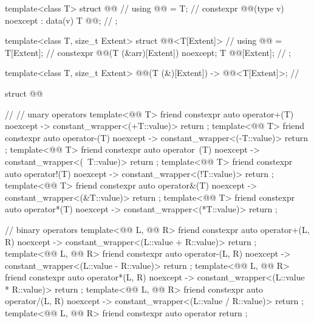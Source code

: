 \begin{codeblock}
template<class T>
struct @@ {                                                         // \expos
  using @@ = T;                                                               // \expos
  constexpr @@(type v) noexcept : data(v) {}
  T @@;                                                                       // \expos
};

template<class T, size_t Extent>
struct @@<T[Extent]> {                                              // \expos
  using @@ = T[Extent];                                                       // \expos
  constexpr @@(T (&arr)[Extent]) noexcept;
  T @@[Extent];                                                               // \expos
};

template<class T, size_t Extent>
  @@(T (&)[Extent]) -> @@<T[Extent]>;                   // \expos

struct @@ {                                                           // \expos
  // unary operators
  template<@@ T>
    friend constexpr auto operator+(T) noexcept -> constant_wrapper<(+T::value)>
      { return {}; }
  template<@@ T>
    friend constexpr auto operator-(T) noexcept -> constant_wrapper<(-T::value)>
      { return {}; }
  template<@@ T>
    friend constexpr auto operator~(T) noexcept -> constant_wrapper<(~T::value)>
      { return {}; }
  template<@@ T>
    friend constexpr auto operator!(T) noexcept -> constant_wrapper<(!T::value)>
      { return {}; }
  template<@@ T>
    friend constexpr auto operator&(T) noexcept -> constant_wrapper<(&T::value)>
      { return {}; }
  template<@@ T>
    friend constexpr auto operator*(T) noexcept -> constant_wrapper<(*T::value)>
      { return {}; }

  // binary operators
  template<@@ L, @@ R>
    friend constexpr auto operator+(L, R) noexcept -> constant_wrapper<(L::value + R::value)>
      { return {}; }
  template<@@ L, @@ R>
    friend constexpr auto operator-(L, R) noexcept -> constant_wrapper<(L::value - R::value)>
      { return {}; }
  template<@@ L, @@ R>
    friend constexpr auto operator*(L, R) noexcept -> constant_wrapper<(L::value * R::value)>
      { return {}; }
  template<@@ L, @@ R>
    friend constexpr auto operator/(L, R) noexcept -> constant_wrapper<(L::value / R::value)>
      { return {}; }
  template<@@ L, @@ R>
    friend constexpr auto operator%
      { return {}; }

}
\end{codeblock}
